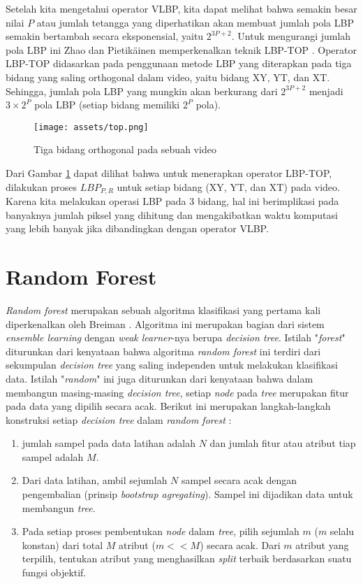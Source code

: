 \documentclass[review,3p,12pt,times]{elsarticle}
\begin{document}
Setelah kita mengetahui operator VLBP, kita dapat melihat bahwa semakin besar nilai $P$ atau jumlah tetangga yang diperhatikan akan membuat jumlah pola LBP semakin bertambah secara eksponensial, yaitu $2^{3P+2}$. Untuk mengurangi jumlah pola LBP ini Zhao dan Pietik\"{a}inen memperkenalkan teknik LBP-TOP \cite{zhao2007dynamic2}. Operator LBP-TOP didasarkan pada penggunaan metode LBP yang diterapkan pada tiga bidang yang saling orthogonal dalam video, yaitu bidang XY, YT, dan XT. Sehingga, jumlah pola LBP yang mungkin akan berkurang dari $2^{3P+2}$ menjadi $3 \times 2^P$ pola LBP (setiap bidang memiliki $2^P$ pola).
\begin{figure}[hbt!]
\caption{Tiga bidang orthogonal pada sebuah video \cite{zhao2007dynamic2}}
\label{fig:top}
\centering
	\texttt{[image: assets/top.png]}
	
\end{figure}

Dari Gambar \ref{fig:top} dapat dilihat bahwa untuk menerapkan operator LBP-TOP, dilakukan proses $LBP_{P,R}$ untuk setiap bidang (XY, YT, dan XT) pada video. Karena kita melakukan operasi LBP pada 3 bidang, hal ini berimplikasi pada banyaknya jumlah piksel yang dihitung dan mengakibatkan waktu komputasi yang lebih banyak jika dibandingkan dengan operator VLBP.


\section{Random Forest}
\label{randforest}

\textit{Random forest} merupakan sebuah algoritma klasifikasi yang pertama kali diperkenalkan oleh Breiman \cite{breiman2001random}. Algoritma ini merupakan bagian dari sistem \textit{ensemble learning} dengan \textit{weak learner}-nya berupa \textit{decision tree}. Istilah "\textit{forest}" diturunkan dari kenyataan bahwa algoritma \textit{random forest} ini terdiri dari sekumpulan \textit{decision tree} yang saling independen untuk melakukan klasifikasi data. Istilah "\textit{random}" ini juga diturunkan dari kenyataan bahwa dalam membangun masing-masing \textit{decision tree}, setiap \textit{node} pada \textit{tree} merupakan fitur pada data yang dipilih secara acak. Berikut ini merupakan langkah-langkah konstruksi setiap \textit{decision tree} dalam \textit{random forest} \cite{breimanonline}:

\begin{enumerate}
\item jumlah sampel pada data latihan adalah $N$ dan jumlah fitur atau atribut tiap sampel adalah $M$.
\item Dari data latihan, ambil sejumlah $N$ sampel secara acak dengan pengembalian (prinsip \textit{bootstrap agregating}). Sampel ini dijadikan data untuk membangun \textit{tree}.
\item Pada setiap proses pembentukan \textit{node} dalam \textit{tree}, pilih sejumlah $m$ ($m$ selalu konstan) dari total $M$ atribut ($m << M$) secara acak. Dari $m$ atribut yang terpilih, tentukan atribut yang menghasilkan \textit{split} terbaik berdasarkan suatu fungsi objektif.

\end{enumerate}
\end{document}

